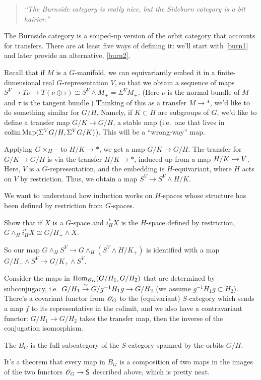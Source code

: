 \begin{quote}\textit{
	``The Burnside category is really nice, but the Sideburn category is a bit hairier.''
}\end{quote}
The Burnside category is a souped-up version of the orbit category that accounts for transfers. There are at least
five ways of defining it: we'll start with \cref{burn1} and later provide an alternative, \cref{burn2}.

Recall that if $M$ is a $G$-manifold, we can equivariantly embed it in a finite-dimensional real $G$-representation
$V$, so that we obtain a sequence of maps $S^V\to T\!\nu\to T(\nu\oplus\tau)\cong S^V\wedge M_+ = \Sigma^V M_+$.
(Here $\nu$ is the normal bundle of $M$ and $\tau$ is the tangent bundle.) Thinking of this as a transfer $M\to *$,
we'd like to do something similar for $G/H$. Namely, if $K\subset H$ are subgroups of $G$, we'd like to define a
transfer map $G/K\to G/H$, a stable map (i.e.\ one that lives in $\operatorname*{colim}\operatorname{Map}(\Sigma^V G/H, \Sigma^V G/K)$). This
will be a ``wrong-way'' map.

Applying $G\times_H\text{--}$ to $H/K\to *$, we get a map $G/K\to G/H$. The transfer for $G/K\to G/H$ is via the transfer
$H/K\to *$, induced up from a map $H/K\hookrightarrow V$. Here, $V$ is a $G$-representation, and the embedding is
$H$-equivariant, where $H$ acts on $V$ by restriction. Thus, we obtain a map $S^V\to S^V\wedge H/K$.

We want to understand how induction works on $H$-spaces whose structure has been defined by restriction from
$G$-spaces.
\begin{ex}
Show that if $X$ is a $G$-space and $i_H^*X$ is the $H$-space defined by restriction, $G\wedge_H i_H^*X\cong
G/H_+\wedge X$.
\end{ex}
So our map $G\wedge_H S^V\to G\wedge_H(S^V\wedge H/K_+)$ is identified with a map $G/H_+\wedge S^V\to G/K_+\wedge
S^V$.

Consider the maps in $\operatorname{Hom}_{\mathscr O_G}(G/H_1, G/H_2)$ that are determined by subconjugacy, i.e.\ $G/H_1\stackrel\cong\to
G/g^{-1}H_1g\to G/H_2$ (we assume $g^{-1}H_1g\subset H_2$). There's a covariant functor from $\mathscr O_G$ to the
(equivariant) $S$-category which sends a map $f$ to its representative in the colimit, and we also have a
contravariant functor: $G/H_1\to G/H_2$ takes the transfer map, then the inverse of the conjugation isomorphism.
\begin{defn}
\label{burn1}
The  $B_G$ is the full subcategory of the $S$-category spanned by the orbits $G/H$.
\end{defn}
It's a theorem that every map in $B_G$ is a composition of two maps in the images of the two functors $\mathscr O_G\to\mathsf
S$ described above, which is pretty neat.

